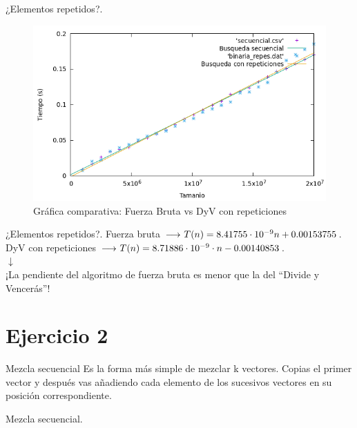 \documentclass[10pt, xcolor=table]{beamer}
\begin{document}
\begin{frame}[fragile]{¿Elementos repetidos?. }
	\begin{figure}[h!]
		\centering
		\includegraphics[scale=0.45]{./Images/Grafica_secvsrep.png}
		\caption{Gráfica comparativa: Fuerza Bruta vs DyV con repeticiones}
	\end{figure}
\end{frame}

\begin{frame}[fragile]{¿Elementos repetidos?. }
	\centering Fuerza bruta \(\longrightarrow$ \( T(n) = 8.41755 \cdot 10^{-9} n + 0.00153755\).\\
	
	\centering DyV con repeticiones \(\longrightarrow$ \( T(n) = 8.71886 \cdot 10^{-9} \cdot n -0.00140853 \).\\
	
	\centering $\downarrow$ \\
	
	\centering ¡La pendiente del algoritmo de fuerza bruta es menor que la del ``Divide y Vencerás''!
\end{frame}

\section{Ejercicio 2}
\begin{frame}[fragile]{Mezcla secuencial}
Es la forma más simple de mezclar k vectores. Copias el primer vector y después vas añadiendo cada elemento de los sucesivos vectores en su posición correspondiente.
\end{frame}

\begin{frame}[fragile]{Mezcla secuencial. }

\end{frame}
\end{document}
